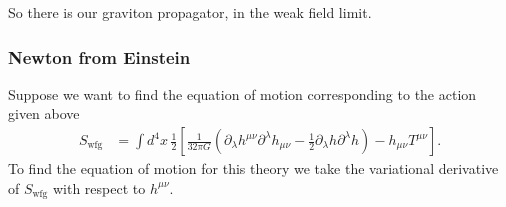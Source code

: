 \documentclass{book}
\theoremstyle{definition}
\newcommand{\p}{\partial}
\newcommand{\f}[2]{\frac{#1}{#2}}
\newcommand{\lp}{\left(}
\newcommand{\rp}{\right)}
\newcommand{\lb}{\left[}
\newcommand{\rb}{\right]}
\begin{document}
So there is our graviton propagator, in the weak field limit.




\subsubsection{Newton from Einstein}

Suppose we want to find the equation of motion corresponding to the action given above
\begin{align}
S_\text{wfg} &= \int d^4x\, \f{1}{2}\lb \f{1}{32\pi G}\lp \p_\lambda h^{\mu\nu} \p^\lambda h_{\mu\nu} - \f{1}{2}\p_\lambda h\p^\lambda h \rp - h_{\mu\nu}T^{\mu\nu} \rb.
\end{align}
To find the equation of motion for this theory we take the variational derivative of $S_\text{wfg}$ with respect to $h^{\mu\nu}$. \\
\end{document}
